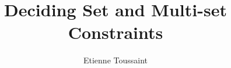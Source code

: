 \documentclass{article}
\title{Deciding Set and Multi-set Constraints}
\author{Etienne Toussaint}
\date{}
\begin{document}
\sloppy
\maketitle







% 





% 












\end{document}
